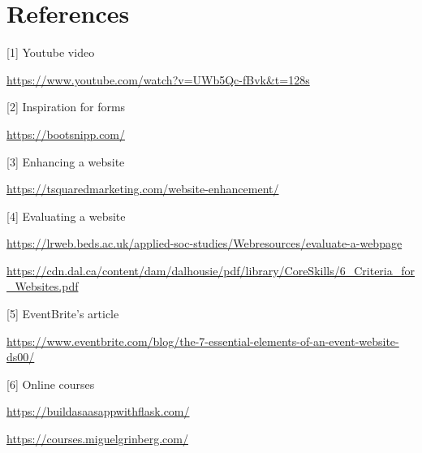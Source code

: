 \documentclass[10pt, a4paper]{article}
\begin{document}
    \section{References}

[1] Youtube video

\url{https://www.youtube.com/watch?v=UWb5Qc-fBvk&t=128s}

[2] Inspiration for forms

\url{https://bootsnipp.com/}

[3] Enhancing a website

\url{https://tsquaredmarketing.com/website-enhancement/}

[4] Evaluating a website

\url{https://lrweb.beds.ac.uk/applied-soc-studies/Webresources/evaluate-a-webpage}

\url{https://cdn.dal.ca/content/dam/dalhousie/pdf/library/CoreSkills/6_Criteria_for_Websites.pdf}

[5] EventBrite's article

\url{https://www.eventbrite.com/blog/the-7-essential-elements-of-an-event-website-ds00/}

[6] Online courses

\url{https://buildasaasappwithflask.com/}

\url{https://courses.miguelgrinberg.com/}
\end{document}
